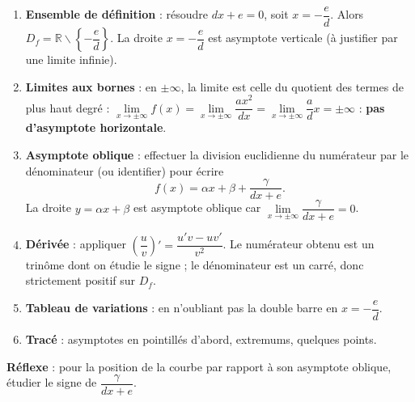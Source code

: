 \documentclass[11pt]{article}
\newcommand{\cle}[1]{{\popxbold\color{popdark}#1}}
\def\setminus{\mathbin{\backslash}}\let\smallsetminus\setminus
\begin{document}
\begin{methode}[Plan d'étude de $f(x)=\dfrac{ax^2+bx+c}{dx+e}$]
\begin{enumerate}
\item \textbf{Ensemble de définition} : résoudre $dx+e=0$, soit $x=-\dfrac{e}{d}$. Alors $D_f=\mathbb{R}\setminus\left\{-\dfrac{e}{d}\right\}$. La droite $x=-\dfrac{e}{d}$ est \cle{asymptote verticale} (à justifier par une limite infinie).
\item \textbf{Limites aux bornes} : en $\pm\infty$, la limite est celle du quotient des termes de plus haut degré : $\lim\limits_{x\to\pm\infty}f(x)=\lim\limits_{x\to\pm\infty}\dfrac{ax^2}{dx}=\lim\limits_{x\to\pm\infty}\dfrac{a}{d}x=\pm\infty$ : \textbf{pas d'asymptote horizontale}.
\item \textbf{Asymptote oblique} : effectuer la \cle{division euclidienne} du numérateur par le dénominateur (ou identifier) pour écrire
\[
f(x)=\alpha x+\beta+\dfrac{\gamma}{dx+e}.
\]
La droite $y=\alpha x+\beta$ est asymptote oblique car $\lim\limits_{x\to\pm\infty}\dfrac{\gamma}{dx+e}=0$.
\item \textbf{Dérivée} : appliquer $\left(\dfrac{u}{v}\right)'=\dfrac{u'v-uv'}{v^2}$. Le numérateur obtenu est un trinôme dont on étudie le signe ; le dénominateur est un carré, donc strictement positif sur $D_f$.
\item \textbf{Tableau de variations} : en n'oubliant pas la \cle{double barre} en $x=-\dfrac{e}{d}$.
\item \textbf{Tracé} : asymptotes en pointillés d'abord, extremums, quelques points.
\end{enumerate}
\textbf{Réflexe} : pour la position de la courbe par rapport à son asymptote oblique, étudier le signe de $\dfrac{\gamma}{dx+e}$.
\end{methode}
\end{document}
